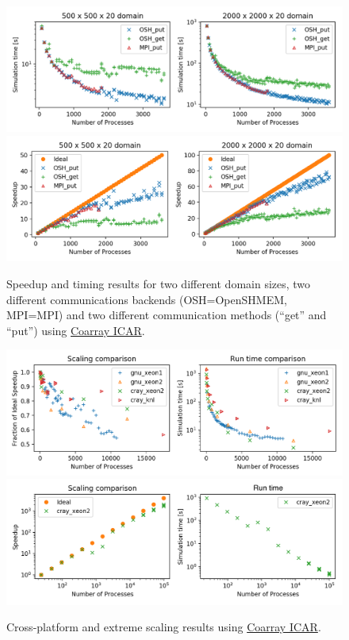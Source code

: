 \begin{figure}
  \includegraphics[width=\textwidth]{figures/fig1_speedup.png}
  \includegraphics[width=\textwidth]{figures/fig2_timing.png}
  \caption{Speedup and timing results for two different domain sizes, two different communications backends (OSH=OpenSHMEM, MPI=MPI) and two different communication methods (``get'' and ``put'') using \href{https://github.com/gutmann/coarray_icar}{Coarray ICAR}.\label{fig1-2}}
\end{figure}

\begin{figure}
  \includegraphics[width=\textwidth]{figures/fig3_cross_platform.png}
  \vspace{-6pt}
  \includegraphics[width=\textwidth]{figures/fig4_extreme_scaling.png}
   \caption{Cross-platform and extreme scaling results using \href{https://github.com/gutmann/coarray_icar}{Coarray ICAR}.\label{fig3-4}}
   \vspace{-6pt}
\end{figure}

